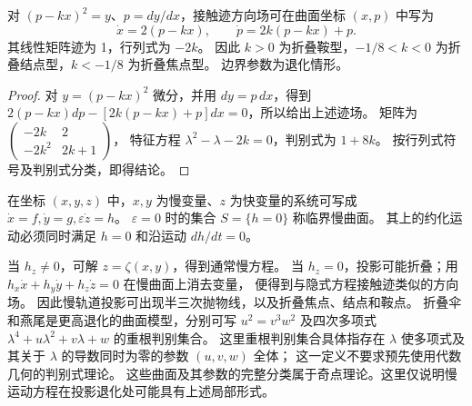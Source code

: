 \begin{proposition}[正规形的类型计算]
对 $(p-kx)^2=y$、$p=dy/dx$，接触迹方向场可在曲面坐标 $(x,p)$ 中写为
\[
 \dot x=2(p-kx),\qquad \dot p=2k(p-kx)+p.
\]
其线性矩阵迹为 1，行列式为 $-2k$。
因此 $k>0$ 为折叠鞍型，$-1/8<k<0$ 为折叠结点型，$k<-1/8$ 为折叠焦点型。
边界参数为退化情形。
\end{proposition}
\begin{proof}
对 $y=(p-kx)^2$ 微分，并用 $dy=p\,dx$，得到
$2(p-kx)dp-[2k(p-kx)+p]dx=0$，所以给出上述迹场。
矩阵为
$\left(\begin{smallmatrix}-2k&2\\-2k^2&2k+1\end{smallmatrix}\right)$，
特征方程 $\lambda^2-\lambda-2k=0$，判别式为 $1+8k$。
按行列式符号及判别式分类，即得结论。
\end{proof}

\begin{definition}[快慢系统]
在坐标 $(x,y,z)$ 中，$x,y$ 为慢变量、$z$ 为快变量的系统可写成
$\dot x=f,\dot y=g,\varepsilon\dot z=h$。
$\varepsilon=0$ 时的集合 $S=\{h=0\}$ 称临界慢曲面。
其上的约化运动必须同时满足 $h=0$ 和沿运动 $dh/dt=0$。
\end{definition}
当 $h_z\ne0$，可解 $z=\zeta(x,y)$，得到通常慢方程。
当 $h_z=0$，投影可能折叠；用
$h_x\dot x+h_y\dot y+h_z\dot z=0$ 在慢曲面上消去变量，
便得到与隐式方程接触迹类似的方向场。
因此慢轨道投影可出现半三次抛物线，以及折叠焦点、结点和鞍点。
折叠伞和燕尾是更高退化的曲面模型，分别可写
$u^2=v^3w^2$ 及四次多项式
$\lambda^4+u\lambda^2+v\lambda+w$ 的重根判别集合。
这里重根判别集合具体指存在 $\lambda$ 使多项式及其关于 $\lambda$ 的导数同时为零的参数 $(u,v,w)$ 全体；
这一定义不要求预先使用代数几何的判别式理论。
这些曲面及其参数的完整分类属于奇点理论。这里仅说明慢运动方程在投影退化处可能具有上述局部形式。
